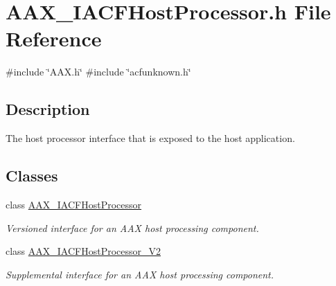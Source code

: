\hypertarget{a00536}{}\section{A\+A\+X\+\_\+\+I\+A\+C\+F\+Host\+Processor.\+h File Reference}
\label{a00536}
{\ttfamily \#include \char`\"{}A\+A\+X.\+h\char`\"{}}\newline
{\ttfamily \#include \char`\"{}acfunknown.\+h\char`\"{}}\newline


\subsection{Description}
The host processor interface that is exposed to the host application. 

\subsection*{Classes}
\begin{DoxyCompactItemize}
\item 
class \mbox{\hyperlink{a01693}{A\+A\+X\+\_\+\+I\+A\+C\+F\+Host\+Processor}}
\begin{DoxyCompactList}\small\item\em Versioned interface for an A\+AX host processing component. \end{DoxyCompactList}\item 
class \mbox{\hyperlink{a01697}{A\+A\+X\+\_\+\+I\+A\+C\+F\+Host\+Processor\+\_\+\+V2}}
\begin{DoxyCompactList}\small\item\em Supplemental interface for an A\+AX host processing component. \end{DoxyCompactList}\end{DoxyCompactItemize}
